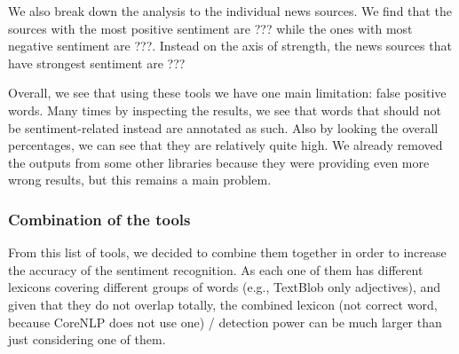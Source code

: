 We also break down the analysis to the individual news sources.
We find that the sources with the most positive sentiment are ??? while the ones with most negative sentiment are ???.
Instead on the axis of strength, the news sources that have strongest sentiment are ???


Overall, we see that using these tools we have one main limitation: false positive words. Many times by inspecting the results, we see that words that should not be sentiment-related instead are annotated as such. Also by looking the overall percentages, we can see that they are relatively quite high.
We already removed the outputs from some other libraries because they were providing even more wrong results, but this remains a main problem.




\subsubsection{\statusgreen Combination of the tools}

From this list of tools, we decided to combine them together in order to increase the accuracy of the sentiment recognition. %
As each one of them has different lexicons covering different groups of words (e.g., TextBlob only adjectives), and given that they do not overlap totally, the combined lexicon (not correct word, because CoreNLP does not use one) / detection power can be much larger than just considering one of them.


